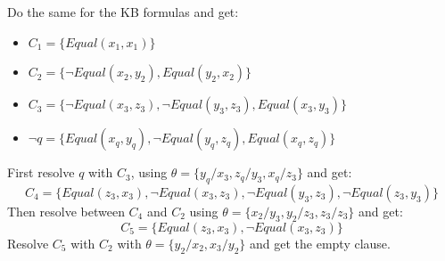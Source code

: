 \documentclass[10pt,a4paper]{article}
\begin{document}
Do the same for the KB formulas and get:
\begin{itemize}
\item $C_1=\lbrace Equal(x_1,x_1) \rbrace$
\item $C_2=\lbrace \neg Equal(x_2,y_2), Equal(y_2,x_2)\rbrace$
\item $C_3=\lbrace \neg Equal(x_3,z_3), \neg Equal(y_3,z_3),  Equal(x_3,y_3) \rbrace$
\item $\neg q= \lbrace Equal(x_q, y_q),\neg Equal(y_q, z_q), Equal(x_q, z_q) \rbrace$
\end{itemize}

First resolve $q$ with $C_3$, using $\theta=\lbrace y_q/x_3, z_q/y_3, x_q/z_3 \rbrace$ and get:
\[C_4=\lbrace Equal(z_3,x_3),\neg Equal(x_3,z_3),\neg Equal(y_3,z_3),\neg Equal(z_3,y_3) \rbrace\]
Then resolve between $C_4$ and $C_2$  using $\theta=\lbrace x_2/y_3, y_2/z_3, z_3/z_3 \rbrace$ and get:
\[C_5= \lbrace Equal(z_3,x_3),\neg Equal(x_3,z_3) \rbrace\]
Resolve $C_5$ with $C_2$ with $\theta=\lbrace y_2/x_2, x_3/y_2 \rbrace$ and get the empty clause.
\end{document}
